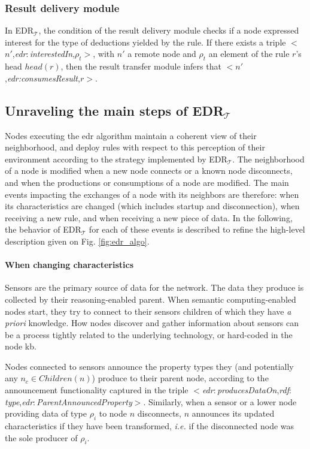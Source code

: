 \documentclass[sw]{iosart2x}
\newcommand{\edrt}{EDR$_{\mathcal{T}}$\xspace}
\newcommand{\namespace}[1]{\textit{#1$:$}}
\newcommand{\concept}[2]{\namespace{#1}\-\textit{#2}}
\newcommand{\triplet}[3]{$<$#1,\textit{#2},#3$>$}
\begin{document}
\subsubsection{Result delivery module}

In \edrt, the condition of the result delivery module checks if a node expressed interest for the type of deductions yielded by the rule. 
If there exists a triple \triplet{$n'$}{\concept{edr}{interest\-ed\-In}}{$\rho_t$}, with $n'$ a remote node and $\rho_t$ an element of the rule $r$'s head $head(r)$, then the result transfer module infers that \triplet{$n'$}{edr:consumes\-Result}{$r$}. 

\subsection{Unraveling the main steps of \edrt}
\label{subs:edrpt_algo}

Nodes executing the \gls{edr} algorithm maintain a coherent view of their neighborhood, and deploy rules with respect to this perception of their environment according to the strategy implemented by \edrt.
The neighborhood of a node is modified when a new node connects or a known node disconnects, and when the productions or consumptions of a node are modified.
The main events impacting the exchanges of a node with its neighbors are therefore: when its characteristics are changed (which includes startup and disconnection), when receiving a new rule, and when receiving a new piece of data.
In the following, the behavior of \edrt for each of these events is described to refine the high-level description given on Fig. \ref{fig:edr_algo}.

\paragraph{When changing characteristics}
\label{subsub:init}
Sensors are the primary source of data for the network. The data they produce is collected by their reasoning-enabled parent. 
When semantic computing-enabled nodes start, they try to connect to their sensors children of which they have \textit{a priori} knowledge.
How nodes discover and gather information about sensors can be a process tightly related to the underlying technology, or hard-coded in the node \gls{kb}.

Nodes connected to sensors announce the property types they (and potentially any $n_c\in Children(n)$) produce to their parent node, according to the announcement functionality captured in the triple \triplet{\concept{edr}{produces\-Data\-On}}{\concept{rdf}{type}}{\concept{edr}{Parent\-An\-noun\-ced\-Pro\-per\-ty}}.  
Similarly, when a sensor or a lower node providing data of type $\rho_{i}$ to node $n$ disconnects, $n$ announces its updated characteristics if they have been transformed, \textit{i.e.} if the disconnected node was the sole producer of $\rho_{i}$.
\end{document}
